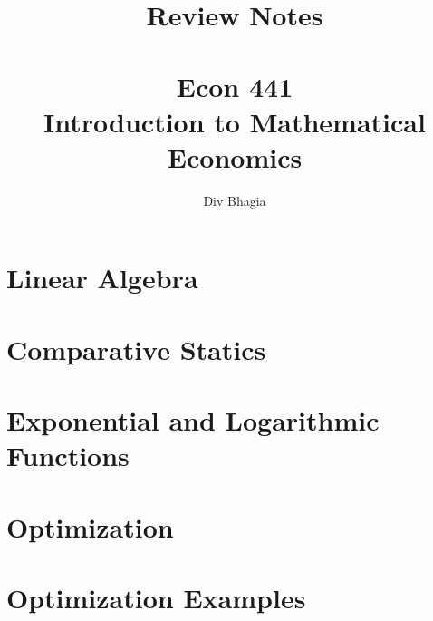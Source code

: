 \documentclass{./../Latex/notes}
\numberwithin{section}{chapter}
\begin{document}
\title{Review Notes \\~\\ Econ 441 \\ Introduction to Mathematical Economics}
\author{Div Bhagia}
\date{}

\begin{titlepage}
    \maketitle
    \tableofcontents    
\end{titlepage}

\chapter{Linear Algebra}
\vspace{-6cm}


\chapter{Comparative Statics}
\vspace{-6cm}


\chapter{Exponential and Logarithmic Functions}
\vspace{-6cm}


\chapter{Optimization}
\vspace{-6cm}


\chapter{Optimization Examples}
\vspace{-6cm}

\end{document}

